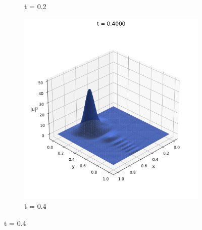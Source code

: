 \documentclass{article}
\theoremstyle{definition}
\theoremstyle{plain}
\theoremstyle{remark}
\begin{document}
\begin{figure}[h]
\begin{subfigure}[b]{0.3\textwidth}
    \caption{t = 0.2}
  \end{subfigure}
  \hfill
  \begin{subfigure}[b]{0.3\textwidth}
    \centering
    \includegraphics[width=\textwidth, trim=0cm 0cm 0cm 1cm, clip]{figures/fem_potential_frame_0040.png}
    \caption{t = 0.4}
  \end{subfigure}
  
  \vspace{0.5cm}
  

\end{figure}
\end{document}

